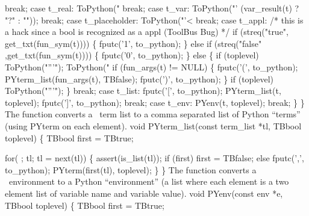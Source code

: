       break;
    case t_real:
      ToPython("%
      break;
    case t_var:
      ToPython("'%
               (var_result(t) ? "?" : ""));
      break;
    case t_placeholder:
      ToPython("'<%
      break;
    case t_appl:
      /* this is a hack since a bool is recognized as a appl (ToolBus Bug) */
      if (streq("true", get_txt(fun_sym(t)))) \{
        fputc('1', to_python);
      \} else if (streq("false" ,get_txt(fun_sym(t)))) \{
        fputc('0', to_python);
      \} else \{
        if (toplevel) ToPython("'''");
        ToPython("%
        if (fun_args(t) != NULL) \{
          fputc('(', to_python);
          PYterm_list(fun_args(t), TBfalse);
          fputc(')', to_python);
        \}
        if (toplevel) ToPython("'''");
      \}
      break;
    case t_list:
      fputc('[', to_python);
      PYterm_list(t, toplevel);
      fputc(']', to_python);
      break;
    case t_env:
      PYenv(t, toplevel);
      break;
  \}
\}
\nwendcode{}\nwdocspar
The  function converts a \TB\ term list to a
comma separated list of Python ``terms'' (using PYterm on each
element).
\nwenddocs{}\plusendmoddef\nwstartdeflinemarkup{}\nwenddeflinemarkup
void PYterm_list(const term_list *tl, TBbool toplevel) \{
  TBbool first = TBtrue;

  for( ; tl; tl = next(tl)) \{
    assert(is_list(tl));    
    if (first) first = TBfalse;
    else       fputc(',', to_python);
    PYterm(first(tl), toplevel);
  \}
\}
\nwendcode{}\nwdocspar
The  function converts a \TB\ environment to a Python
``environment'' (a list where each element is a two element list of
variable name and variable value).
\nwenddocs{}\plusendmoddef\nwstartdeflinemarkup{}\nwenddeflinemarkup
void PYenv(const env *e, TBbool toplevel) \{
  TBbool first = TBtrue;

